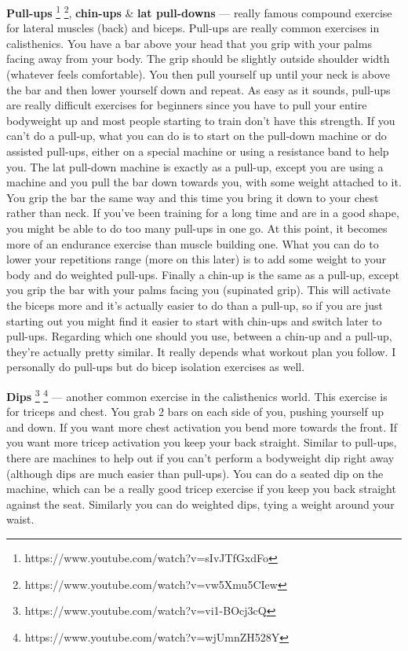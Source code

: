 \documentclass[openany, 12pt]{book}
\begin{document}
        \textbf{Pull-ups}
        \footnote{https://www.youtube.com/watch?v=sIvJTfGxdFo}
        \footnote{https://www.youtube.com/watch?v=vw5Xmu5CIew},
        \textbf{chin-ups} \& \textbf{lat pull-downs}
        --- really famous compound exercise for lateral muscles (back) and biceps. Pull-ups are really common exercises in calisthenics. You have a bar above your head that you grip with your palms facing
        away from your body. The grip should be slightly outside shoulder width (whatever feels comfortable). You then pull yourself up until your neck is above the bar and then lower yourself down and
        repeat. As easy as it sounds, pull-ups are really difficult exercises for beginners since you have to pull your entire bodyweight up and most people starting to train don't have this strength.
        If you can't do a pull-up, what you can do is to start on the pull-down machine or do assisted pull-ups, either on a special machine or using
        a resistance band to help you. The lat pull-down machine is exactly as a pull-up, except you are using a machine and you pull the bar down towards you, with some weight attached to it.
        You grip the bar the same way and this time you bring it down to your chest rather than neck.
        If you've been training for a long time and are in a good shape, you might be able to do too many pull-ups in one go. At this point, it
        becomes more of an endurance exercise than muscle building one. What you can do to lower your repetitions range (more on this later) is to add some weight to your body and do weighted
        pull-ups. Finally a chin-up is the same as a pull-up, except you grip the bar with your palms facing you (supinated grip). This will activate the biceps more and it's actually easier to
        do than a pull-up, so if you are just starting out you might find it easier to start with chin-ups and switch later to pull-ups. Regarding which one should you use, between a chin-up and
        a pull-up, they're actually pretty similar. It really depends what workout plan you follow. I personally do pull-ups but do bicep isolation exercises as well.

        \textbf{Dips}
        \footnote{https://www.youtube.com/watch?v=vi1-BOcj3cQ}
        \footnote{https://www.youtube.com/watch?v=wjUmnZH528Y}
        --- another common exercise in the calisthenics world. This exercise is for triceps and chest. You grab 2 bars on each side of you, pushing yourself up and down.
        If you want more chest activation you bend more towards the front. If you want more tricep activation you keep your back straight. Similar to pull-ups, there are machines to
        help out if you can't perform a bodyweight dip right away (although dips are much easier than pull-ups). You can do a seated dip on the machine, which can be a really good
        tricep exercise if you keep you back straight against the seat. Similarly you can do weighted dips, tying a weight around your waist.
\end{document}
